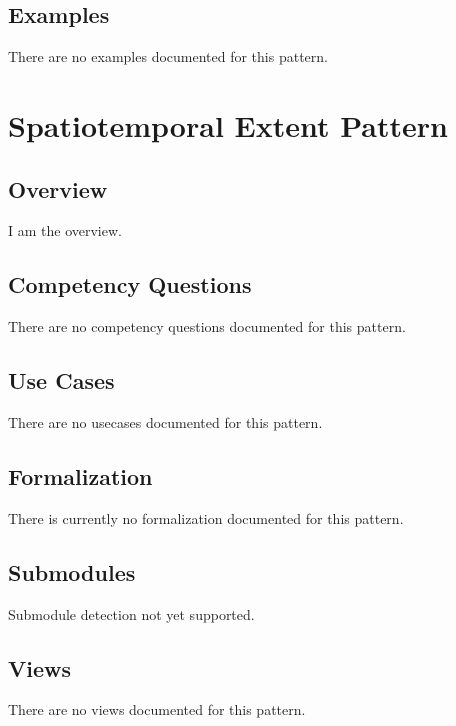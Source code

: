 \subsection{Examples}
\label{ssec:examples}
There are no examples documented for this pattern.


\section{Spatiotemporal Extent Pattern}
\label{sec:spatiotemporal-extent-pattern}
\subsection{Overview}
\label{ssec:overview}
I am the overview.

\subsection{Competency Questions}
\label{ssec:cqs}
There are no competency questions documented for this pattern.

\subsection{Use Cases}
\label{ssec:use-cases}
There are no usecases documented for this pattern.
\subsection{Formalization}
\label{ssec:formalization}
There is currently no formalization documented for this pattern.

\subsection{Submodules}
\label{ssec:submodules}
Submodule detection not yet supported.

\subsection{Views}
\label{ssec:views}
There are no views documented for this pattern.


